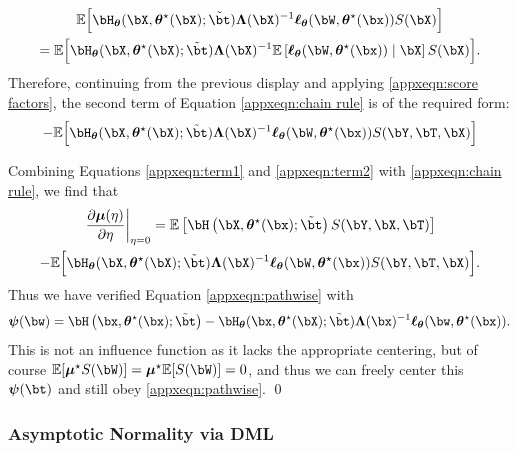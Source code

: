 \documentclass[12pt]{article}
\numberwithin{equation}{section}
\theoremstyle{definition}
\newcommand{\E}{\mathbb{E}}
\newcommand{\bmu}{\boldsymbol{\mu}}
\newcommand{\btheta}{\boldsymbol{\theta}}
\newcommand{\bpsi}{\boldsymbol{\psi}}
\newcommand{\bL}{\boldsymbol{\Lambda}}
\newcommand{\bmtrue}{\bmu^\star}
\newcommand{\bttrue}{\btheta^\star}
\newcommand{\btstar}{\tilde{\bt}}
\begin{document}
\begin{appendices}
\begin{multline*}
	\E\Big[  \bH_{\btheta}(\bX, \bttrue(\bX); \btstar) \bL(\bX)^{-1} \bm{\ell}_{\btheta}(\bW, \bttrue(\bx)) S(\bX)  \Big]
	\\
	= \E\Big[  \bH_{\btheta}(\bX, \bttrue(\bX); \btstar) \bL(\bX)^{-1} \E\left[  \bm{\ell}_{\btheta}(\bW, \bttrue(\bx)) \mid \bX \right] S( \bX)  \Big].
\end{multline*}
Therefore, continuing from the previous display and applying \eqref{appxeqn:score factors}, the second term of Equation \eqref{appxeqn:chain rule} is of the required form:
\begin{equation}
	\label{appxeqn:term2}
	- \E\Big[  \bH_{\btheta}(\bX, \bttrue(\bX); \btstar) \bL(\bX)^{-1} \bm{\ell}_{\btheta}(\bW, \bttrue(\bx)) S(\bY,\bT, \bX)  \Big]
\end{equation}


Combining Equations \eqref{appxeqn:term1} and \eqref{appxeqn:term2} with \eqref{appxeqn:chain rule}, we find that
\begin{multline}
	\label{appxeqn:pathwise2}
	\left. \frac{\partial \bmu(\eta)}{\partial \eta} \right\vert_{\eta=0}
	= 
	\E\left[\bH\left(\bX, \bttrue(\bx); \btstar\right) S(\bY,\bX,\bT)\right]
	\\ 	
	- \E\Big[  \bH_{\btheta}(\bX, \bttrue(\bX); \btstar) \bL(\bX)^{-1} \bm{\ell}_{\btheta}(\bW, \bttrue(\bx)) S(\bY,\bT, \bX)  \Big].
\end{multline}
Thus we have verified Equation \eqref{appxeqn:pathwise} with
\begin{equation}
	\label{appxeqn:IF}
	\bpsi(\bw) =  \bH\left(\bx, \bttrue(\bx); \btstar\right)   - \bH_{\btheta}(\bx, \bttrue(\bX); \btstar) \bL(\bx)^{-1} \bm{\ell}_{\btheta}(\bw, \bttrue(\bx)).
\end{equation}
This is not an influence function as it lacks the appropriate centering, but of course $\E[\bmtrue S(\bW)] = \bmtrue \E[ S(\bW) ] = 0$, and thus we can freely center this $\bpsi(\bt)$ and still obey \eqref{appxeqn:pathwise}. \qed
















\subsubsection{Asymptotic Normality via DML}
	\label{appx:clt}



\end{appendices}
\end{document}
